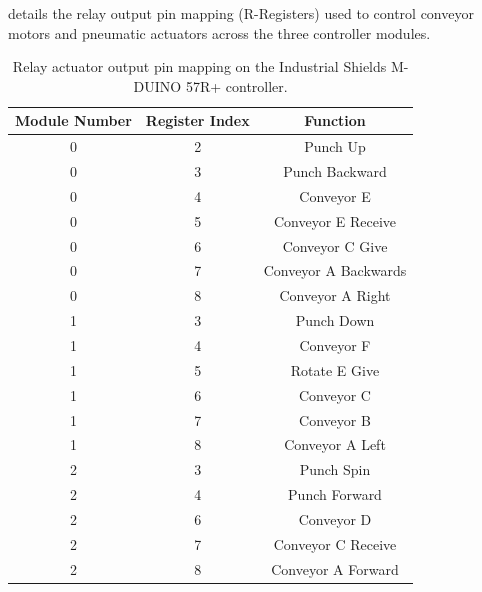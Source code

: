  details the relay output pin mapping (R-Registers) used to control conveyor motors and pneumatic actuators across the three controller modules.

\begin{table}[htbp]
    \centering
    \caption{Relay actuator output pin mapping on the Industrial Shields M-DUINO 57R+ controller.}
    \label{tab:fms_actuator_outputs}
    \begin{tabular}{ccc}
        \toprule
        \textbf{Module Number} & \textbf{Register Index} & \textbf{Function} \\
        \midrule
        0 & 2 & Punch Up \\
        0 & 3 & Punch Backward \\
        0 & 4 & Conveyor E \\
        0 & 5 & Conveyor E Receive \\
        0 & 6 & Conveyor C Give \\
        0 & 7 & Conveyor A Backwards \\
        0 & 8 & Conveyor A Right \\
        \midrule
        1 & 3 & Punch Down \\
        1 & 4 & Conveyor F \\
        1 & 5 & Rotate E Give \\
        1 & 6 & Conveyor C \\
        1 & 7 & Conveyor B \\
        1 & 8 & Conveyor A Left \\
        \midrule
        2 & 3 & Punch Spin \\
        2 & 4 & Punch Forward \\
        2 & 6 & Conveyor D \\
        2 & 7 & Conveyor C Receive \\
        2 & 8 & Conveyor A Forward \\
        \bottomrule
    \end{tabular}
\end{table}
